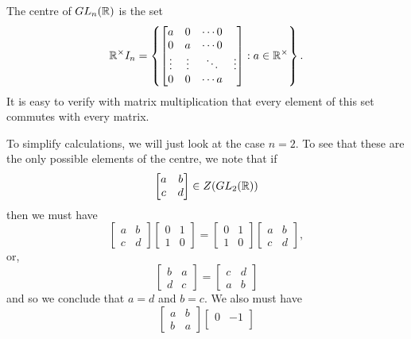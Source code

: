 \begin{example}
  The centre of $GL_{n}(\mathbb{R})$ is the set
  \[
   \mathbb{R}^{\times} I_{n} = \left\{\begin{bmatrix}
     a & 0 & \cdots 0 \\
     0 & a & \cdots 0 \\
     \vdots & \vdots & \ddots & \vdots \\
     0 & 0 & \cdots a \\
   \end{bmatrix} : a \in \mathbb{R}^{\times} \right\}.
  \]
  It is easy to verify with matrix multiplication that every element of this
  set commutes with every matrix.
  
  To simplify calculations, we will just look at the case $n = 2$.  To see that
  these are the only possible elements of the centre, we note that if
  \[
    \begin{bmatrix}
      a & b \\
      c & d
    \end{bmatrix} \in Z(GL_{2}(\mathbb{R}))
  \]
  then we must have
  \[
    \begin{bmatrix}
      a & b \\
      c & d
    \end{bmatrix}
    \begin{bmatrix}
      0 & 1 \\
      1 & 0
    \end{bmatrix}
    =
    \begin{bmatrix}
      0 & 1 \\
      1 & 0
    \end{bmatrix}
    \begin{bmatrix}
      a & b \\
      c & d
    \end{bmatrix},
  \]
  or,
  \[
    \begin{bmatrix}
      b & a \\
      d & c
    \end{bmatrix}
    =
    \begin{bmatrix}
      c & d \\
      a & b
    \end{bmatrix}
  \]
  and so we conclude that $a = d$ and $b = c$.  We also must have
  \[
    \begin{bmatrix}
      a & b \\
      b & a
    \end{bmatrix}
    \begin{bmatrix}
      0 & -1 \\

\end{bmatrix}\]
\end{example}
